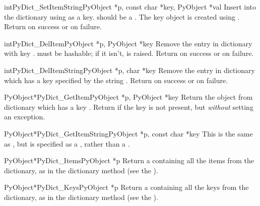 \begin{cfuncdesc}{int}{PyDict_SetItemString}{PyObject *p,
            const char *key,
            PyObject *val}
  Insert  into the dictionary  using  as a
  key.  should be a .  The key object is created
  using . Return  on
  success or  on failure.
\end{cfuncdesc}

\begin{cfuncdesc}{int}{PyDict_DelItem}{PyObject *p, PyObject *key}
  Remove the entry in dictionary  with key .
   must be hashable; if it isn't,  is
  raised.  Return  on success or  on failure.
\end{cfuncdesc}

\begin{cfuncdesc}{int}{PyDict_DelItemString}{PyObject *p, char *key}
  Remove the entry in dictionary  which has a key specified by
  the string .  Return  on success or  on
  failure.
\end{cfuncdesc}

\begin{cfuncdesc}{PyObject*}{PyDict_GetItem}{PyObject *p, PyObject *key}
  Return the object from dictionary  which has a key
  .  Return \NULL{} if the key  is not present, but
  \emph{without} setting an exception.
\end{cfuncdesc}

\begin{cfuncdesc}{PyObject*}{PyDict_GetItemString}{PyObject *p, const char *key}
  This is the same as , but  is
  specified as a , rather than a .
\end{cfuncdesc}

\begin{cfuncdesc}{PyObject*}{PyDict_Items}{PyObject *p}
  Return a  containing all the items from the
  dictionary, as in the dictionary method  (see the
  ).
\end{cfuncdesc}

\begin{cfuncdesc}{PyObject*}{PyDict_Keys}{PyObject *p}
  Return a  containing all the keys from the
  dictionary, as in the dictionary method  (see the
  ).
\end{cfuncdesc}

